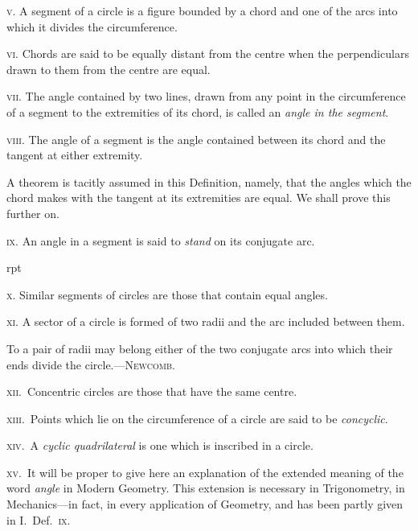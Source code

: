 \documentclass[oneside]{book}
\newcommand\imgflow[3]{
\setcounter{wrapwidth}{#1}
\begin{wrapfigure}[#2]{r}{\value{wrapwidth}pt}
\begin{center}
\vspace{-0.3in}
\end{center}
\end{wrapfigure}
}
\begin{document}
\textsc{v.} A segment of a circle is a figure bounded by a
chord and one of the arcs into which it divides the
circumference.

\textsc{vi.} Chords are said to be equally distant from the
centre when the perpendiculars drawn to them from
the centre are equal.

\textsc{vii.} The angle contained by two lines, drawn from
any point in the circumference of a segment to the
extremities of its chord, is called an \emph{angle in the segment}.

\textsc{viii.} The angle of a segment is the angle contained
between its chord and the tangent at either extremity.\par\smallskip

\begin{footnotesize}
A theorem is tacitly assumed in this Definition, namely, that
the angles which the chord makes with the tangent at its extremities
are equal. We shall prove this further on.
\par\end{footnotesize}\smallskip

\textsc{ix.} An angle in a segment is said to \emph{stand} on its
conjugate arc.

\imgflow{95}{6}{f102}

\textsc{x.} Similar segments of circles are
those that contain equal angles.

\textsc{xi.} A sector of a circle is formed
of two radii and the arc included
between them.\par\smallskip

\begin{footnotesize}
To a pair of radii may belong either of the two conjugate arcs
into which their ends divide the circle.---\textsc{Newcomb}.
\par\end{footnotesize}\smallskip


\textsc{xii}.\ Concentric circles are those that have the same
centre.

\textsc{xiii}.\ Points which lie on the circumference of a
circle are said to be \emph{concyclic}.

\textsc{xiv}.\ A \emph{cyclic quadrilateral} is one which is inscribed
in a circle.

\textsc{xv}.\ It will be proper to give here an explanation of
the extended meaning of the word \emph{angle} in Modern
Geometry. This extension is necessary in Trigonometry,
in Mechanics---in fact, in every application of
Geometry, and has been partly given in I.\ Def.\ \textsc{ix}.
\end{document}
